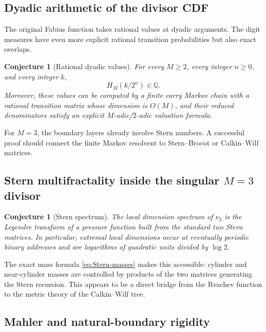 \documentclass[11pt,oneside]{article}
\newtheorem{conjecture}[theorem]{Conjecture}
\theoremstyle{definition}
\theoremstyle{remark}
\numberwithin{equation}{section}
\newcommand{\1}{\mathbf 1}
\begin{document}
\subsection{Dyadic arithmetic of the divisor CDF}

The original Fabius function takes rational values at dyadic arguments.  The digit measures
have even more explicit rational transition probabilities but also exact overlaps.

\begin{conjecture}[Rational dyadic values]
\label{conj:dyadic-rationality}
For every $M\ge2$, every integer $n\ge0$, and every integer $k$,
\begin{equation}
 H_M(k/2^n)\in\mathbb Q.
 \label{eq:dyadic-H-conj}
\end{equation}
Moreover, these values can be computed by a finite carry Markov chain with a rational
transition matrix whose dimension is $O(M)$, and their reduced denominators satisfy an
explicit $M$-adic/$2$-adic valuation formula.
\end{conjecture}

For $M=3$, the boundary layers already involve Stern numbers.  A successful proof should
connect the finite Markov resolvent to Stern--Brocot or Calkin--Wilf matrices.

\subsection{Stern multifractality inside the singular $M=3$ divisor}

\begin{conjecture}[Stern spectrum]
\label{conj:Stern-spectrum}
The local dimension spectrum of $\nu_3$ is the Legendre transform of a pressure function
built from the standard two Stern matrices.  In particular, extremal local dimensions occur
at eventually periodic binary addresses and are logarithms of quadratic units divided by
$\log2$.
\end{conjecture}

The exact mass formula \eqref{eq:Stern-masses} makes this accessible: cylinder and
near-cylinder masses are controlled by products of the two matrices generating the Stern
recursion.  This appears to be a direct bridge from the Rvachev function to the metric theory
of the Calkin--Wilf tree.

\subsection{Mahler and natural-boundary rigidity}
\end{document}
